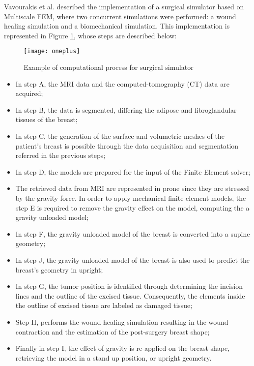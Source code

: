 Vavourakis et al. \cite{Vavourakis2016} described the implementation of a surgical simulator based on Multiscale FEM, where two concurrent simulations were performed: a wound healing simulation and a biomechanical simulation. This implementation is represented in Figure \ref{fig:surgical_simulator}, whose steps are described below:

\begin{figure}[H]
\begin{center}
    \leavevmode
    \texttt{[image: oneplus]}
    \caption[Example of computational process for surgical simulator]{Example of computational process for surgical simulator \cite{Vavourakis2016}}
    \label{fig:surgical_simulator}
  \end{center}
\end{figure}

\vspace{24mm}

\begin{itemize}
\item In step A, the MRI data and the computed-tomography (CT) data are acquired;
\item In step B, the data is segmented, differing the adipose and fibroglandular tissues of the breast;
\item In step C, the generation of the surface and volumetric meshes of the patient's breast is possible through the data acquisition and segmentation referred in the previous steps;
\item In step D, the models are prepared for the input of the Finite Element solver;
\item The retrieved data from MRI are represented in prone since they are stressed by the gravity force. In order to apply mechanical finite element models, the step E is required to remove the gravity effect on the model, computing the a gravity unloaded model;
\item In step F, the gravity unloaded model of the breast is converted into a supine geometry;
\item In step J, the gravity unloaded model of the breast is also used to predict the breast's geometry in upright;
\item In step G, the tumor position is identified through determining the incision lines and the outline of the excised tissue. Consequently, the elements inside the outline of excised tissue are labeled as damaged tissue;
\item Step H, performs the wound healing simulation resulting in the wound contraction and the estimation of the post-surgery breast shape;
\item Finally in step I, the effect of gravity is re-applied on the breast shape, retrieving the model in a stand up position, or upright geometry.
\end{itemize}

